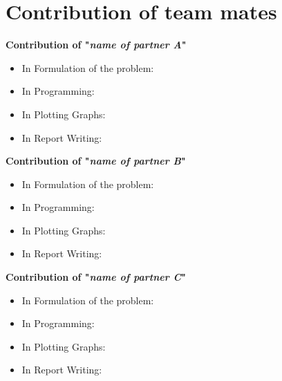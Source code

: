 \documentclass[12pt]{article}
\begin{document}
\section{Contribution of team mates}
\large{\bf {Contribution of "{\it name of partner A}"}}
\begin{itemize}
   \item In Formulation of the problem:  
   \item  In Programming: 
   \item  In Plotting Graphs:
   \item  In Report Writing: 
\end{itemize}
\large{\bf {Contribution of "{\it name of partner B}"}}
\begin{itemize}
   \item In Formulation of the problem:  
   \item  In Programming: 
   \item  In Plotting Graphs:
   \item  In Report Writing:
\end{itemize}
\large{\bf {Contribution of "{\it name of partner C}"}}
\begin{itemize}
   \item In Formulation of the problem:  
   \item  In Programming: 
   \item  In Plotting Graphs:
   \item  In Report Writing: 
\end{itemize}

\end{document}
